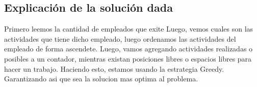 \documentclass[a4paper,10pt]{article}
\begin{document}
\subsection{Explicación de la solución dada}
\hspace{2cm}Primero leemos la cantidad de empleados que exite
Luego, vemos cuales son las actividades que tiene dicho empleado, luego ordenamos las actividades del empleado de forma ascendete.
Luego, vamos agregando actividades realizadas o posibles a un contador, mientras existan posiciones libres o espacios libres para hacer un trabajo. Haciendo esto, estamos usando la estrategia Greedy. Garantizando asi que sea la solucion mas optima al problema.
\end{document}
